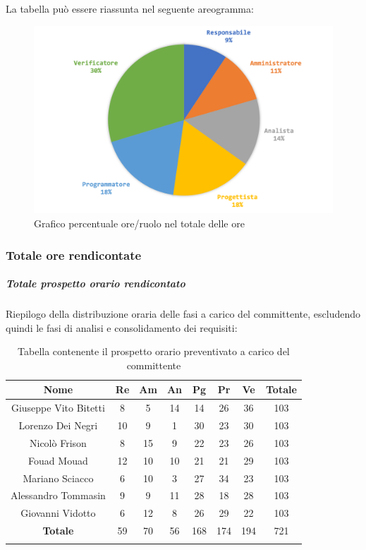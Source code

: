 			La tabella può essere riassunta nel seguente areogramma:
			\begin{figure}[H]
				\centering
				\includegraphics[width=0.8\linewidth]{./images/preventivo/totOre2.png}
				\caption{Grafico percentuale ore/ruolo nel totale delle ore}
				\label{fig:grafico costi ruolo fase totale ore}
			\end{figure}
		
			\subsubsection{Totale ore rendicontate}
				\subparagraph{Totale prospetto orario rendicontato}
				Riepilogo della distribuzione oraria delle fasi a carico del committente, escludendo quindi le fasi di analisi e consolidamento dei requisiti:
				
				\begin{longtable}{|c|c|c|c|c|c|c|c|}
					\hline
					\rowcolor{lighter-grayer}
					\textbf{Nome} & \textbf{Re} & \textbf{Am} & \textbf{An} & \textbf{Pg}  & \textbf{Pr}   & \textbf{Ve} & \textbf{Totale} \\
					\hline
					\endfirsthead
					
					\hline
					Giuseppe Vito Bitetti 		& 8 & 5 & 14 & 14 & 26 & 36 & 103\\
					\hline
					\hline
					Lorenzo Dei Negri			& 10 & 9 & 1 & 30 & 23 & 30 & 103\\
					\hline
					\hline
					Nicolò Frison				    & 8 & 15 & 9 & 22 & 23 & 26 & 103\\
					\hline
					\hline
					Fouad Mouad 				 & 12 & 10 & 10 & 21 & 21 & 29 & 103\\
					\hline
					\hline
					Mariano Sciacco 			& 6 & 10 & 3 & 27 & 34 & 23 & 103\\
					\hline
					\hline
					Alessandro Tommasin    & 9 & 9 & 11 & 28 & 18 & 28 & 103\\
					\hline
					\hline
					Giovanni Vidotto 			 & 6 & 12 & 8 & 26 & 29 & 22 & 103\\
					\hline 
					\textbf{Totale}				 & 59 &  70 & 56 & 168 & 174 & 194 & 721\\
					\hline
					\caption{Tabella contenente il prospetto orario preventivato a carico del committente}
				\end{longtable}
				\pagebreak
				
